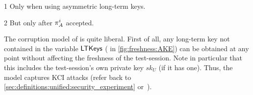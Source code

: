 \begin{table}
\begin{threeparttable}
\begin{adjustbox}{center}
%			
%			
%			
%			
%			
%			
%			
%			
	
	\end{adjustbox}
		
	\begin{tablenotes}
	    
	    \item[1] Only when using asymmetric long-term keys.  
	    
	    \item[2] But only after $\oracle[A][i]$ accepted.
	    
	\end{tablenotes}
	
	\end{threeparttable}
	


\end{table}


The corruption model of \akefstext  is quite liberal.
First of all,
any long-term key not contained in the variable $\mathsf{LTKeys}$ 
( in \cref{fig:freshness:AKE})
can be obtained at any point without affecting the freshness of the test-session.
Note in particular that this includes the test-session's own private key $sk_U$ (if it has one).
Thus,
the \akefstext model captures KCI attacks (refer back to \cref{sec:definitions:unified:security_experiment} or~\cite{AC:JusVau96,Blake-WilsonM:1997:BR93_asymmetric}).



